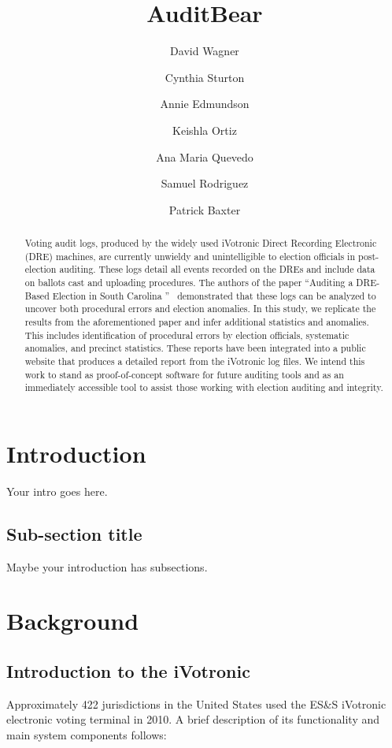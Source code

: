 \documentclass[letterpaper,twocolumn,10pt]{article}
\begin{document}
\title{AuditBear}
\author{David Wagner
\and Cynthia Sturton
\and Annie Edmundson
\and Keishla Ortiz
\and Ana Maria Quevedo
\and Samuel Rodriguez
\and Patrick Baxter}
\maketitle
\begin{abstract}
Voting audit logs, produced by the widely used iVotronic Direct Recording Electronic (DRE) machines, are currently unwieldy and unintelligible to election officials in post-election auditing. These logs detail all events recorded on the DREs and include data on ballots cast and uploading procedures. The authors of the paper \textquotedblleft Auditing a DRE-Based Election in South Carolina \textquotedblright ~\cite{Buell2011} demonstrated that these logs can be analyzed to uncover both procedural errors and  election anomalies.  In this study, we replicate the results from the aforementioned paper and infer additional statistics and anomalies. This includes identification of procedural errors by election officials, systematic anomalies, and precinct statistics. These reports have been integrated into a public website that produces a detailed report from the iVotronic log files.  We intend this work to stand as proof-of-concept software for future auditing tools and as an immediately accessible tool to assist those working with election auditing and integrity.
\end{abstract}

\section{Introduction}
Your intro goes here.

\subsection{Sub-section title}
Maybe your introduction has subsections.
\section{Background}

\subsection{Introduction to the iVotronic}
Approximately 422 jurisdictions in the United States used the ES\&S iVotronic electronic voting terminal in 2010.  A brief description of  its functionality and main system components follows:
\end{document}
